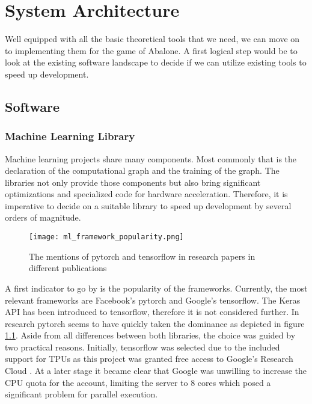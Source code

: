\chapter{System Architecture}
\label{system-architecture}
Well equipped with all the basic theoretical tools that we need, we can move on to implementing them for the game of Abalone. A first logical step would be to look at the existing software landscape to decide if we can utilize existing tools to speed up development.

\section{Software}
\subsection{Machine Learning Library}
Machine learning projects share many components. Most commonly that is the declaration of the computational graph and the training of the graph. The libraries not only provide those components but also bring significant optimizations and specialized code for hardware acceleration. Therefore, it is imperative to decide on a suitable library to speed up development by several orders of magnitude.

\begin{figure}
    \centering
    \texttt{[image: ml\_framework\_popularity.png]}
    \caption{The mentions of pytorch and tensorflow in research papers in different publications \cite{noauthor_state_2019}}
    \label{ml_framework_popularity}
\end{figure}

A first indicator to go by is the popularity of the frameworks. Currently, the most relevant frameworks are Facebook's pytorch and Google's tensorflow. The Keras API has been introduced to tensorflow, therefore it is not considered further. In research pytorch seems to have quickly taken the dominance as depicted in figure \ref{ml_framework_popularity}. Aside from all differences between both libraries, the choice was guided by two practical reasons. Initially, tensorflow was selected due to the included support for TPUs as this project was granted free access to Google's Research Cloud \cite{noauthor_tpu_nodate}. At a later stage it became clear that Google was unwilling to increase the CPU quota for the account, limiting the server to 8 cores which posed a significant problem for parallel execution.


